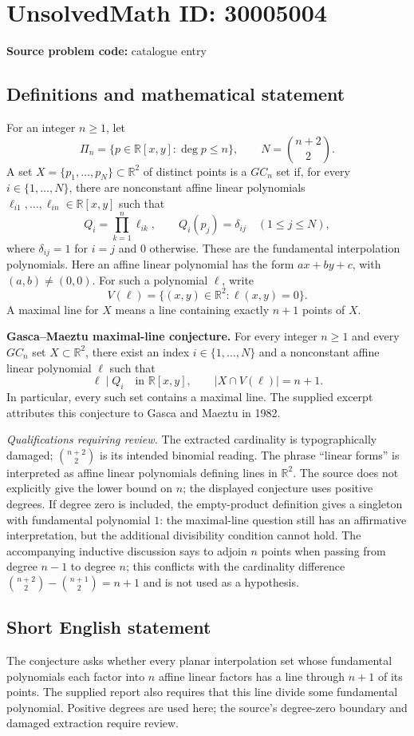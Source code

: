 \documentclass[11pt]{article}
\newcommand{\R}{\mathbb{R}}
\begin{document}
\section*{UnsolvedMath ID: 30005004}
\textbf{Source problem code:} catalogue entry
\subsection{Definitions and mathematical statement}
For an integer \(n\geq 1\), let
\[
\Pi_n=\{p\in\R[x,y]:\deg p\leq n\},\qquad N=\binom{n+2}{2}.
\]
A set \(X=\{p_1,\ldots,p_N\}\subset\R^2\) of distinct points is a \(GC_n\) set if, for every \(i\in\{1,\ldots,N\}\), there are nonconstant affine linear polynomials \(\ell_{i1},\ldots,\ell_{in}\in\R[x,y]\) such that
\[
Q_i=\prod_{k=1}^{n}\ell_{ik},\qquad
Q_i(p_j)=\delta_{ij}\quad(1\leq j\leq N),
\]
where \(\delta_{ij}=1\) for \(i=j\) and \(0\) otherwise. These are the fundamental interpolation polynomials. Here an affine linear polynomial has the form \(ax+by+c\), with \((a,b)\ne(0,0)\). For such a polynomial \(\ell\), write
\[
V(\ell)=\{(x,y)\in\R^2:\ell(x,y)=0\}.
\]
A maximal line for \(X\) means a line containing exactly \(n+1\) points of \(X\).

\textbf{Gasca--Maeztu maximal-line conjecture.} For every integer \(n\geq1\) and every \(GC_n\) set \(X\subset\R^2\), there exist an index \(i\in\{1,\ldots,N\}\) and a nonconstant affine linear polynomial \(\ell\) such that
\[
\ell\mid Q_i\quad\text{in }\R[x,y],\qquad
\lvert X\cap V(\ell)\rvert=n+1.
\]
In particular, every such set contains a maximal line. The supplied excerpt attributes this conjecture to Gasca and Maeztu in 1982.

\textit{Qualifications requiring review.} The extracted cardinality is typographically damaged; \(\binom{n+2}{2}\) is its intended binomial reading. The phrase ``linear forms'' is interpreted as affine linear polynomials defining lines in \(\R^2\). The source does not explicitly give the lower bound on \(n\); the displayed conjecture uses positive degrees. If degree zero is included, the empty-product definition gives a singleton with fundamental polynomial \(1\): the maximal-line question still has an affirmative interpretation, but the additional divisibility condition cannot hold. The accompanying inductive discussion says to adjoin \(n\) points when passing from degree \(n-1\) to degree \(n\); this conflicts with the cardinality difference \(\binom{n+2}{2}-\binom{n+1}{2}=n+1\) and is not used as a hypothesis.
\subsection{Short English statement}
The conjecture asks whether every planar interpolation set whose fundamental polynomials each factor into \(n\) affine linear factors has a line through \(n+1\) of its points. The supplied report also requires that this line divide some fundamental polynomial. Positive degrees are used here; the source's degree-zero boundary and damaged extraction require review.
\end{document}
